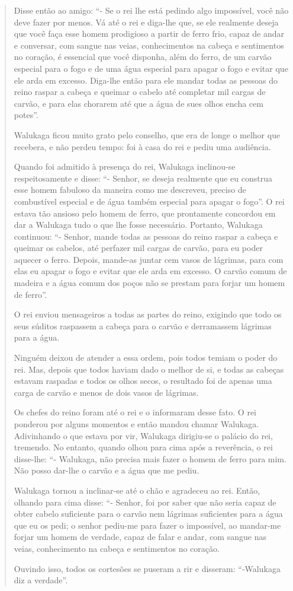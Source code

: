 \documentclass[
  letterpaper,
  DIV=11,
  numbers=noendperiod]{scrreprt}
\begin{document}
\begin{quote}
Disse então ao amigo: ``- Se o rei lhe está pedindo algo impossível,
você não deve fazer por menos. Vá até o rei e diga-lhe que, se ele
realmente deseja que você faça esse homem prodigioso a partir de ferro
frio, capaz de andar e conversar, com sangue nas veias, conhecimentos na
cabeça e sentimentos no coração, é essencial que você disponha, além do
ferro, de um carvão especial para o fogo e de uma água especial para
apagar o fogo e evitar que ele arda em excesso. Diga-lhe então para ele
mandar todas as pessoas do reino raspar a cabeça e queimar o cabelo até
completar mil cargas de carvão, e para elas chorarem até que a água de
sues olhos encha cem potes''.

Walukaga ficou muito grato pelo conselho, que era de longe o melhor que
recebera, e não perdeu tempo: foi à casa do rei e pediu uma audiência.

Quando foi admitido à presença do rei, Walukaga inclinou-se
respeitosamente e disse: ``- Senhor, se deseja realmente que eu construa
esse homem fabuloso da maneira como me descreveu, preciso de combustível
especial e de água também especial para apagar o fogo''. O rei estava
tão ansioso pelo homem de ferro, que prontamente concordou em dar a
Walukaga tudo o que lhe fosse necessário. Portanto, Walukaga continuou:
``- Senhor, mande todas as pessoas do reino raspar a cabeça e queimar os
cabelos, até perfazer mil cargas de carvão, para eu poder aquecer o
ferro. Depois, mande-as juntar cem vasos de lágrimas, para com elas eu
apagar o fogo e evitar que ele arda em excesso. O carvão comum de
madeira e a água comum dos poços não se prestam para forjar um homem de
ferro''.

O rei enviou mensageiros a todas as partes do reino, exigindo que todo
os seus súditos raspassem a cabeça para o carvão e derramassem lágrimas
para a água.

Ninguém deixou de atender a essa ordem, pois todos temiam o poder do
rei. Mas, depois que todos haviam dado o melhor de si, e todas as
cabeças estavam raspadas e todos os olhos secos, o resultado foi de
apenas uma carga de carvão e menos de dois vasos de lágrimas.

Os chefes do reino foram até o rei e o informaram desse fato. O rei
ponderou por alguns momentos e então mandou chamar Walukaga. Adivinhando
o que estava por vir, Walukaga dirigiu-se o palácio do rei, tremendo. No
entanto, quando olhou para cima após a reverência, o rei disse-lhe: ``-
Walukaga, não precisa mais fazer o homem de ferro para mim. Não posso
dar-lhe o carvão e a água que me pediu.

Walukaga tornou a inclinar-se até o chão e agradeceu ao rei. Então,
olhando para cima disse: ``- Senhor, foi por saber que não seria capaz
de obter cabelo suficiente para o carvão nem lágrimas suficientes para a
água que eu os pedi; o senhor pediu-me para fazer o impossível, ao
mandar-me forjar um homem de verdade, capaz de falar e andar, com sangue
nas veias, conhecimento na cabeça e sentimentos no coração.

Ouvindo isso, todos os cortesões se puseram a rir e disseram:
``-Walukaga diz a verdade''.
\end{quote}
\end{document}
